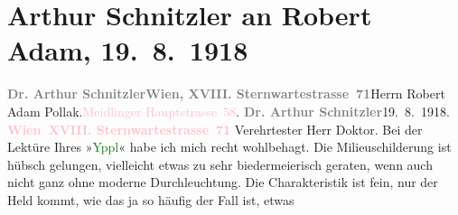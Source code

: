 

               \section[Arthur Schnitzler an Robert Adam, 19. 8. 1918]{ Arthur Schnitzler an Robert Adam, 19. 8. 1918}\nopagebreak{}\rehead{ }\normalsize\beginnumbering{} \toendnotes[C]{\smallbreak\pagebreak[2]} 
\toendnotes[C]{\smallbreak}\pstart{}{\pb}\textcolor{gray}{\textbf{Dr. Arthur Schnitzler}}\pend{}\pstart{}\textcolor{pink}{\textcolor{gray}{\textbf{Wien, XVIII. Sternwartestrasse 71}}}{}\ledrightnote{\textcolor{pink}{Sternwartestraße}}\pend{}{\bigskip}\pstart{}{\pb}Herrn Robert Adam Pollak\pend{}\pstart{}\textcolor{pink}{}{}\ledrightnote{\textcolor{pink}{XII., Meidling}}.\pend{}\pstart{}\textcolor{pink}{Meidlinger Hauptstrasse 58}{}\ledrightnote{\textcolor{pink}{Meidlinger Hauptstraße}}.\pend{}{\bigskip}\pstart
           {\pb}\textcolor{gray}{\textbf{Dr. Arthur Schnitzler}}\hfill 19. 8. 1918.\pend
           \pstart
           \textcolor{gray}{\textbf{\textcolor{pink}{Wien XVIII. Sternwartestrasse 71}{}\ledrightnote{\textcolor{pink}{Sternwartestraße}}}}\pend
           \pstart\center{}Verehrtester Herr Doktor.\pend\pstart
           Bei der Lektüre Ihres »\textcolor{green}{Yppl}{}\ledrightnote{\textcolor{green}{Yppl. Idylle in fünf Akten}}« habe ich mich recht
               wohlbehagt. Die Milieuschilderung ist hübsch gelungen, vielleicht etwas zu sehr
               biedermeierisch geraten, wenn auch nicht ganz ohne moderne Durchleuchtung. Die
               Charakteristik ist fein, nur der Held kommt, wie das ja so häufig der Fall ist, etwas

